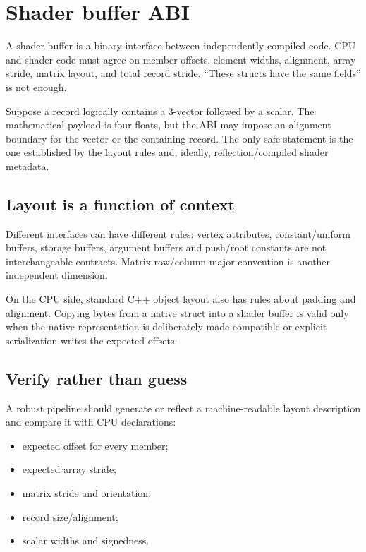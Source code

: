 \hypertarget{appendix-749048795dbb}{}\label{referencestart:appendix-749048795dbb}
\section{Shader buffer ABI}\label{appendix-749048795dbb-shader-buffer-abi}

A shader buffer is a binary interface between independently compiled code. CPU and shader code must agree on member offsets, element widths, alignment, array stride, matrix layout, and total record stride. ``These structs have the same fields'' is not enough.

Suppose a record logically contains a 3-vector followed by a scalar. The mathematical payload is four floats, but the ABI may impose an alignment boundary for the vector or the containing record. The only safe statement is the one established by the layout rules and, ideally, reflection/compiled shader metadata.

\subsection{Layout is a function of context}\label{appendix-749048795dbb-layout-is-a-function-of-context}

Different interfaces can have different rules: vertex attributes, constant/uniform buffers, storage buffers, argument buffers and push/root constants are not interchangeable contracts. Matrix row/column-major convention is another independent dimension.

On the CPU side, standard C++ object layout also has rules about padding and alignment. Copying bytes from a native struct into a shader buffer is valid only when the native representation is deliberately made compatible or explicit serialization writes the expected offsets.

\subsection{Verify rather than guess}\label{appendix-749048795dbb-verify-rather-than-guess}

A robust pipeline should generate or reflect a machine-readable layout description and compare it with CPU declarations:

\begin{itemize}
\tightlist
\item
  expected offset for every member;
\item
  expected array stride;
\item
  matrix stride and orientation;
\item
  record size/alignment;
\item
  scalar widths and signedness.
\end{itemize}

